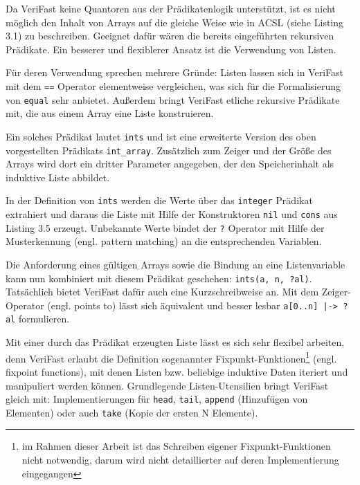 Da VeriFast keine Quantoren aus der Prädikatenlogik unterstützt, ist es nicht möglich den Inhalt von
Arrays auf die gleiche Weise wie in ACSL (siehe Listing 3.1) zu beschreiben. Geeignet dafür wären die bereits eingeführten
rekursiven Prädikate. Ein besserer und flexiblerer Ansatz ist die Verwendung von Listen.

Für deren Verwendung sprechen mehrere Gründe: Listen lassen sich in VeriFast mit dem \lstinline{==} Operator elementweise vergleichen,
was sich für die Formalisierung von \texttt{equal} sehr anbietet. Außerdem bringt VeriFast etliche rekursive Prädikate
mit, die aus einem Array eine Liste konstruieren.



Ein solches Prädikat lautet \lstinline{ints} und ist eine erweiterte Version des oben vorgestellten Prädikats
\lstinline{int_array}. Zusätzlich zum Zeiger und der Größe des Arrays wird dort ein dritter Parameter angegeben, der
den Speicherinhalt als induktive Liste abbildet. 



In der Definition von \lstinline{ints} werden die Werte über das \lstinline{integer} Prädikat extrahiert und
daraus die Liste mit Hilfe der Konstruktoren \lstinline{nil} und \lstinline{cons} aus Listing 3.5 erzeugt. Unbekannte
Werte bindet der \lstinline{?} Operator mit Hilfe der Musterkennung (engl. pattern matching) an die entsprechenden
Variablen.

Die Anforderung eines gültigen Arrays sowie die Bindung an eine Listenvariable kann nun kombiniert mit diesem Prädikat
geschehen: \lstinline{ints(a, n, ?al)}. Tatsächlich bietet VeriFast dafür auch eine Kurzschreibweise an. Mit dem Zeiger-Operator
(engl. points to) lässt sich äquivalent und besser lesbar \lstinline{a[0..n] |-> ?al} formulieren.

Mit einer durch das Prädikat erzeugten Liste lässt es sich sehr flexibel arbeiten, denn VeriFast erlaubt 
die Definition sogenannter Fixpunkt-Funktionen\footnote{im Rahmen dieser Arbeit ist das Schreiben eigener
Fixpunkt-Funktionen nicht notwendig, darum wird nicht detaillierter auf deren Implementierung eingegangen} (engl. fixpoint functions), 
mit denen Listen bzw. beliebige induktive Daten iteriert und manipuliert werden können. Grundlegende
Listen-Utensilien bringt VeriFast gleich mit: Implementierungen für \lstinline{head}, 
\lstinline{tail}, \lstinline{append} (Hinzufügen von Elementen) oder auch \lstinline{take} 
(Kopie der ersten N Elemente).


